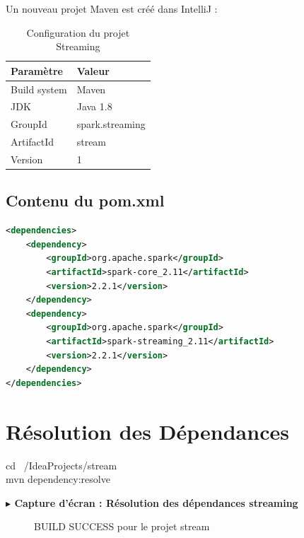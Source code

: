 \documentclass[12pt,a4paper]{report}
\newcommand{\etape}[1]{\vspace{6pt}\textbf{\color{bleuESP}$\blacktriangleright$ #1}\vspace{4pt}}
\begin{document}
Un nouveau projet Maven est créé dans IntelliJ :

\begin{table}[H]
\centering
\begin{tabular}{|l|l|}
\hline
\rowcolor{bleuESP!20}
\textbf{Paramètre} & \textbf{Valeur} \\
\hline
Build system & Maven \\
\hline
JDK & Java 1.8 \\
\hline
GroupId & spark.streaming \\
\hline
ArtifactId & stream \\
\hline
Version & 1 \\
\hline
\end{tabular}
\caption{Configuration du projet Streaming}
\end{table}

\subsection{Contenu du pom.xml}

\begin{lstlisting}[language=xml, caption=pom.xml du projet Streaming]
<dependencies>
    <dependency>
        <groupId>org.apache.spark</groupId>
        <artifactId>spark-core_2.11</artifactId>
        <version>2.2.1</version>
    </dependency>
    <dependency>
        <groupId>org.apache.spark</groupId>
        <artifactId>spark-streaming_2.11</artifactId>
        <version>2.2.1</version>
    </dependency>
</dependencies>
\end{lstlisting}

\section{Résolution des Dépendances}

\begin{cmdbox}
cd ~/IdeaProjects/stream \\
mvn dependency:resolve
\end{cmdbox}

\etape{Capture d'écran : Résolution des dépendances streaming}
\begin{figure}[H]
  \centering
  \caption{BUILD SUCCESS pour le projet stream}
\end{figure}
\end{document}
